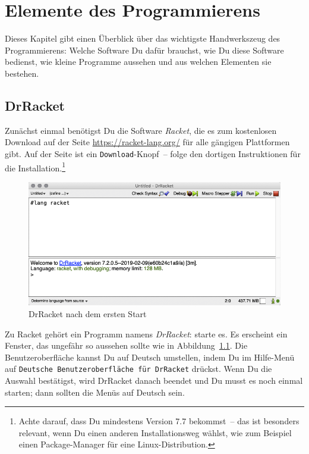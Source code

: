 
\chapter{Elemente des Programmierens}
\label{cha:whats-programming}

Dieses Kapitel gibt einen Überblick über das wichtigste Handwerkszeug
des Programmierens: Welche Software Du dafür brauchst, wie Du diese
Software bedienst, wie kleine Programme aussehen und aus welchen
Elementen sie bestehen.

\section{DrRacket}

Zunächst einmal benötigst Du die Software \textit{Racket}, die es zum
kostenlosen Download auf der Seite \url{https://racket-lang.org/} für
alle gängigen Plattformen gibt.  Auf der Seite ist ein
\texttt{Download}-Knopf~-- folge den dortigen Instruktionen für die
Installation.\footnote{Achte darauf, dass Du mindestens Version 7.7
bekommst~-- das ist besonders relevant, wenn Du einen anderen
Installationsweg wählst, wie zum Beispiel einen Package-Manager für
eine Linux-Distribution.}

\begin{figure}[tb]
  \centering
  \includegraphics[width=\textwidth]{i1prog/drracket-start}
  \caption{DrRacket nach dem ersten Start}
  \label{fig:drracket-start}
\end{figure}

Zu Racket gehört ein Programm namens
\textit{DrRacket}: starte es.  Es erscheint ein
Fenster, das ungefähr so aussehen sollte wie in
Abbildung~\ref{fig:drracket-start}.  Die Benutzeroberfläche kannst
Du auf Deutsch umstellen, indem Du im Hilfe-Menü auf \texttt{Deutsche
  Benutzeroberfläche für DrRacket} drückst.  Wenn Du die Auswahl
bestätigst, wird DrRacket danach beendet und Du musst es noch einmal
starten; dann sollten die Menüs auf Deutsch sein.


